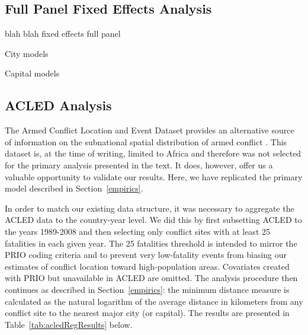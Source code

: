 
\FloatBarrier

\newpage
\subsection{Full Panel Fixed Effects Analysis}

blah blah fixed effects full panel

City models

\FloatBarrier

Capital models

\FloatBarrier

\newpage
\subsection{ACLED Analysis}
\label{acled}

The Armed Conflict Location and Event Dataset provides an alternative source of information on the subnational spatial distribution of armed conflict \citep{raleigh:linke:etal:2010}. This dataset is, at the time of writing, limited to Africa and therefore was not selected for the primary analysis presented in the text. It does, however, offer us a valuable opportunity to validate our results. Here, we have replicated the primary model described in Section~\ref{empirics}.

In order to match our existing data structure, it was necessary to aggregate the ACLED data to the country-year level. We did this by first subsetting ACLED to the years 1989-2008 and then selecting only conflict sites with at least 25 fatalities in each given year. The 25 fatalities threshold is intended to mirror the PRIO coding criteria and to prevent very low-fatality events from biasing our estimates of conflict location toward high-population areas. Covariates created with PRIO but unavailable in ACLED are omitted. The analysis procedure then continues as described in Section~\ref{empirics}: the minimum distance measure is calculated as the natural logarithm of the average distance in kilometers from any conflict site to the nearest major city (or capital). The results are presented in Table~\ref{tab:acledRegResults} below. 


\FloatBarrier
\newpage
